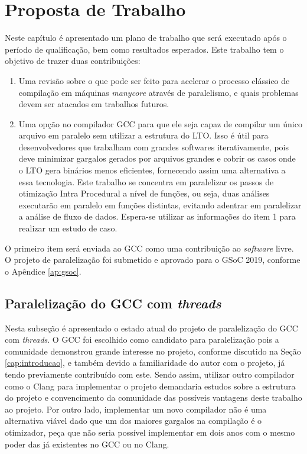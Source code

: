 \chapter{Proposta de Trabalho}
\label{chap:proposta}

Neste capítulo é apresentado um plano de trabalho que será executado
após o período de qualificação, bem como resultados esperados.
Este trabalho tem o objetivo de trazer duas contribuições:
\begin{enumerate}
    \item Uma revisão sobre o que pode ser feito para acelerar o
processo clássico de compilação em máquinas \textit{manycore} através
de paralelismo, e quais problemas devem ser atacados em trabalhos futuros.

    \item Uma opção no compilador GCC para que ele seja
capaz de compilar um único arquivo em paralelo sem utilizar a
estrutura do LTO. Isso é útil para desenvolvedores que trabalham
com grandes softwares iterativamente, pois deve minimizar
gargalos gerados por arquivos grandes e cobrir os casos onde o LTO gera
binários menos eficientes, fornecendo assim uma alternativa a essa tecnologia.
Este trabalho se concentra em paralelizar os passos de otimização Intra Procedural
a nível de funções, ou seja, duas análises executarão em paralelo em funções
distintas, evitando adentrar em paralelizar a análise de fluxo de dados. Espera-se
utilizar as informações do item 1 para realizar um estudo de caso.
\end{enumerate}
O primeiro item será enviada ao GCC como uma contribuição ao \textit{software}
livre. O projeto de paralelização foi submetido e aprovado para o GSoC 2019,
conforme o Apêndice \ref{ap:gsoc}.


\section{Paralelização do GCC com \textit{threads}}

Nesta subseção é apresentado o estado atual do projeto de paralelização
do GCC com \textit{threads}. O GCC foi escolhido como candidato para
paralelização pois a comunidade demonstrou grande interesse no projeto,
conforme discutido na Seção \ref{cap:introducao}, e também devido a familiaridade
do autor com o projeto, já tendo previamente contribuído com este. Sendo assim,
utilizar outro compilador como o Clang para implementar o projeto demandaria
estudos sobre a estrutura do projeto e convencimento da comunidade das possíveis
vantagens deste trabalho ao projeto. Por outro lado, implementar um
novo compilador não é uma alternativa viável dado que um dos maiores gargalos
na compilação é o otimizador, peça que não seria possível implementar em
dois anos com o mesmo poder das já existentes no GCC ou no Clang.

